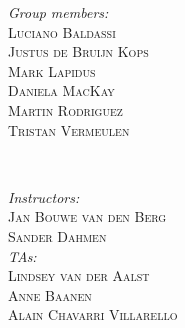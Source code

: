 \begin{titlepage}
	\begin{minipage}[t]{0.5\textwidth}
		\begin{flushleft} \large
			\emph{Group members:}\\
			\hphantom{\& } \textsc{Luciano Baldassi}\\
			\hphantom{\& } \textsc{Justus de Bruijn Kops}\\
			\hphantom{\& } \textsc{Mark Lapidus}\\
			\hphantom{\& } \textsc{Daniela MacKay}\\
			\hphantom{\& } \textsc{Martin Rodriguez}\\
			\hphantom{\& } \textsc{Tristan Vermeulen}
			\end{flushleft}
		\end{minipage}~
    \begin{minipage}[t]{0.4\textwidth}
		\begin{flushleft} \large
			\emph{Instructors:}\\
			\hphantom{\& } \textsc{Jan Bouwe van den Berg}\\
			\hphantom{\& } \textsc{Sander Dahmen} \\[1em]
			\emph{TAs:}\\
			\hphantom{\& } \textsc{Lindsey van der Aalst}\\
			\hphantom{\& } \textsc{Anne Baanen}\\
			\hphantom{\& } \textsc{Alain Chavarri Villarello}
		\end{flushleft}
	\end{minipage}\\[1 cm]



	

\end{titlepage}

